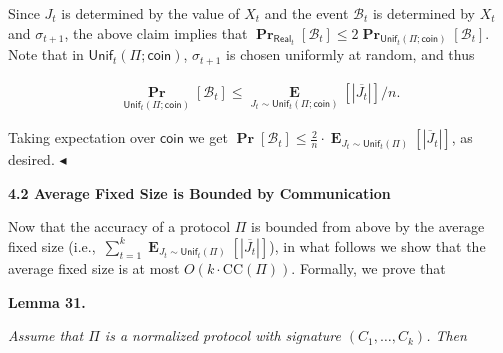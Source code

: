 \documentclass[10pt,a4paper]{article}
\begin{document}



Since $J_{t}$ is determined by the value of $X_{t}$ and the event $\mathcal{B}_{t}$ is determined by $X_{t}$ and $\sigma_{t+1}$, the above claim implies that
$\operatorname*{\mathbf{Pr}}_{\mathsf{Real}_{t}}\left[\mathcal{B}_{t}\right]\leq 2\operatorname*{\mathbf{Pr}}_{\mathsf{Unif}_{t}(\Pi;\mathsf{coin})}\left[\mathcal{B}_{t}\right].$
Note that in $\mathsf{Unif}_{t}(\Pi;\mathsf{coin})$, $\sigma_{t+1}$ is chosen uniformly at random, and thus\par


\[\begin{gathered}
\operatorname*{\mathbf{Pr}}_{\mathsf{Unif}_{t}(\Pi;\mathsf{coin})}\left[\mathcal{B}_{t}\right]\leq\operatorname*{\mathbf{E}}_{J_{t}\sim\mathsf{Unif}_{t}(\Pi;\mathsf{coin})}\left[|\overline{J_{t}}|\right]/n.
\end{gathered}\]


Taking expectation over $\mathsf{coin}$ we get $\operatorname*{\mathbf{Pr}}\left[\mathcal{B}_{t}\right]\leq\frac{2}{n}\cdot\operatorname*{\mathbf{E}}_{J_{t}\sim\mathsf{Unif}_{t}(\Pi)}\left[|\overline{J}_{t}|\right]$, as desired.
$\blacktriangleleft$\par






\par\medskip\noindent\textbf{
4.2 Average Fixed Size is Bounded by Communication}\par




Now that the accuracy of a protocol $\Pi$ is bounded from above by the average fixed size (i.e., $\sum_{t=1}^{k}\operatorname*{\mathbf{E}}_{J_{t}\sim\mathsf{Unif}_{t}(\Pi)}\left[|\overline{J_{t}}|\right]$), in what follows we show that the average fixed size is at most $O(k\cdot\mathrm{CC}(\Pi))$.
Formally, we prove that\par





\par\medskip\noindent\textbf{
\textbf{Lemma 31}\textbf{.}
}\par



\emph{Assume that $\Pi$ is a normalized protocol with signature $(C_{1},\dots,C_{k})$.
Then}\par
\end{document}
